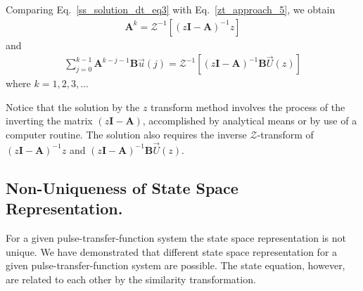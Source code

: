 \documentclass[12pt,a4paper,oneside]{book}
\begin{document}
\begin{onehalfspace}
\begin{equation}
\end{equation}
Comparing Eq.~\eqref{ss_solution_dt_eq3} with  Eq.~\eqref{zt_approach_5}, we 
obtain 
\begin{equation}\label{zt_approach_6}
	\begin{aligned}
		\mathbf{A}^k=\mathcal{Z}^{-1}\left[ \left( 
		z\mathbf{I}-\mathbf{A}\right)^{-1}z \right] 
	\end{aligned}
\end{equation}
and
\begin{equation}\label{zt_approach_7}
	\begin{aligned}
		\sum_{j=0}^{k-1}\mathbf{A}^{k-j-1}\mathbf{B}\vec{u}(j)=\mathcal{Z}^{-1}\left[
		\left( z\mathbf{I}-\mathbf{A}\right)^{-1}\mathbf{B}{\vec{U}}(z) 
		\right] 
	\end{aligned}
\end{equation}
where $k=1,2,3,...$

Notice that the solution by the $z$ transform method involves the process of 
the inverting the matrix $ \left( z\mathbf{I}-\mathbf{A}\right)$, accomplished 
by analytical means or by use of a computer routine. The solution also requires 
the inverse $\mathcal{Z}$-transform of $ \left( 
z\mathbf{I}-\mathbf{A}\right)^{-1}z$ and 
$\left( z\mathbf{I}-\mathbf{A}\right)^{-1}\mathbf{B}{\vec{U}}(z)$.


\subsection{Non-Uniqueness of State Space Representation.} For a given 
pulse-transfer-function system the state space representation is not unique. We 
have demonstrated that different state space representation for a given 
pulse-transfer-function system are possible. The state equation, however, are 
related to each other by the similarity transformation.


\end{onehalfspace}
\end{document}
